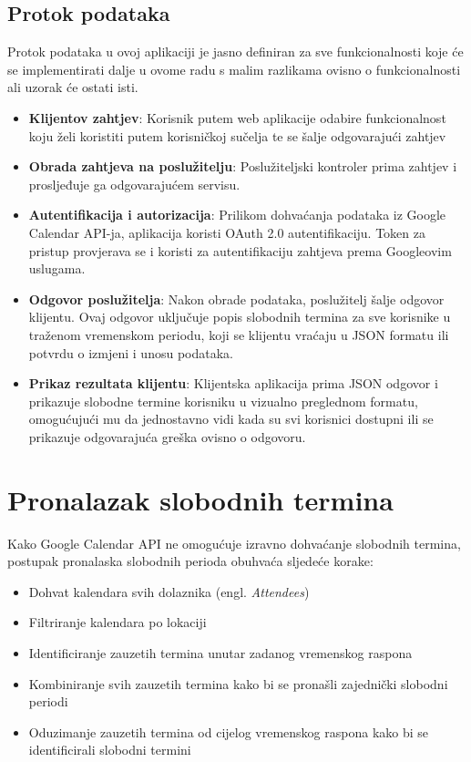 \documentclass{foi}
\begin{document}
\subsection{Protok podataka}

Protok podataka u ovoj aplikaciji je jasno definiran za sve funkcionalnosti koje će se implementirati dalje u ovome radu s malim razlikama ovisno o funkcionalnosti ali uzorak će ostati isti.
\begin{itemize}
    \item \textbf{Klijentov zahtjev}: Korisnik putem web aplikacije odabire funkcionalnost koju želi koristiti putem korisničkoj sučelja te se šalje odgovarajući zahtjev
    \item \textbf{Obrada zahtjeva na poslužitelju}: Poslužiteljski kontroler prima zahtjev i prosljeđuje ga odgovarajućem servisu.
    \item \textbf{Autentifikacija i autorizacija}: Prilikom dohvaćanja podataka iz Google Calendar API-ja, aplikacija koristi OAuth 2.0 autentifikaciju. Token za pristup provjerava se i koristi za autentifikaciju zahtjeva prema Googleovim uslugama.
    \item \textbf{Odgovor poslužitelja}: Nakon obrade podataka, poslužitelj šalje odgovor klijentu. Ovaj odgovor uključuje popis slobodnih termina za sve korisnike u traženom vremenskom periodu, koji se klijentu vraćaju u JSON formatu ili potvrdu o izmjeni i unosu podataka.
    \item \textbf{Prikaz rezultata klijentu}: Klijentska aplikacija prima JSON odgovor i prikazuje slobodne termine korisniku u vizualno preglednom formatu, omogućujući mu da jednostavno vidi kada su svi korisnici dostupni ili se prikazuje odgovarajuća greška ovisno o odgovoru.
\end{itemize}

\section{Pronalazak slobodnih termina}
Kako Google Calendar API ne omogućuje izravno dohvaćanje slobodnih termina, postupak pronalaska slobodnih perioda obuhvaća sljedeće korake:
\begin{itemize}
    \item Dohvat kalendara svih dolaznika (engl. \textit{Attendees})
    \item Filtriranje kalendara po lokaciji
    \item Identificiranje zauzetih termina unutar zadanog vremenskog raspona
    \item Kombiniranje svih zauzetih termina kako bi se pronašli zajednički slobodni periodi
    \item Oduzimanje zauzetih termina od cijelog vremenskog raspona kako bi se identificirali slobodni termini
\end{itemize}
\end{document}
